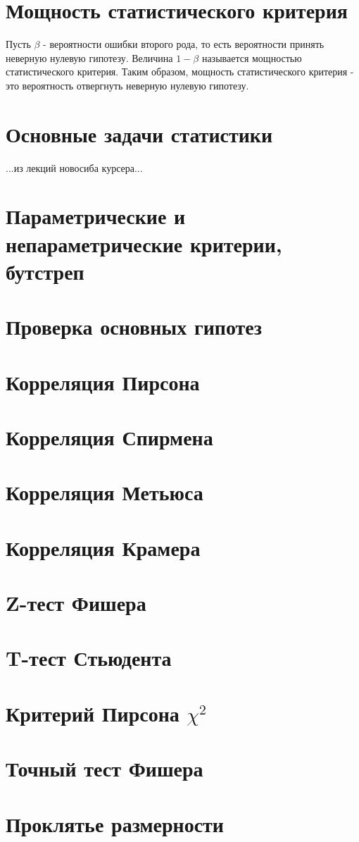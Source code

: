 \section{Мощность статистического критерия}

Пусть $\beta$ - вероятности ошибки второго рода, то есть вероятности принять неверную нулевую гипотезу. Величина $1 - \beta$ называется мощностью статистического критерия. Таким образом, мощность статистического критерия - это вероятность отвергнуть неверную нулевую гипотезу.

\section{Основные задачи статистики}

...из лекций новосиба  курсера...


\section{Параметрические и непараметрические критерии, бутстреп}


\section{Проверка основных гипотез}


\section{Корреляция Пирсона}


\section{Корреляция Спирмена}


\section{Корреляция Метьюса}


\section{Корреляция Крамера}


\section{Z-тест Фишера}


\section{T-тест Стьюдента}


\section{Критерий Пирсона $\chi^2$}


\section{Точный тест Фишера}


\section{Проклятье размерности}



